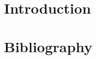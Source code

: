 


\pagestyle{plain}



\tableofcontents
\listoffigures

\clearpage
\fancyhead[L]{\scriptsize{\textsl{\leftmark}}}
\fancyhead[R]{\scriptsize{\textsl{\rightmark}}}

\chapter{Introduction}


% 

\chapter{Bibliography}
\printbibliography[heading=none]


